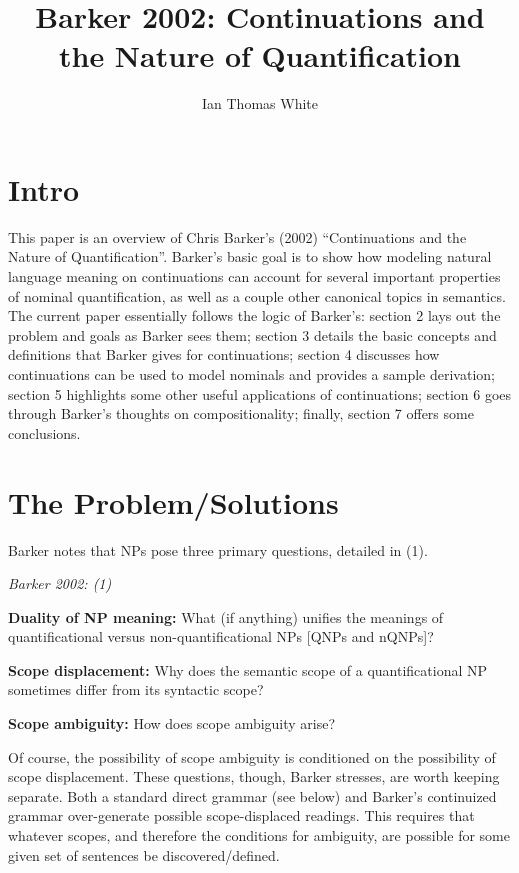\documentclass[11pt]{article}
\title{Barker 2002: Continuations and the Nature of Quantification}
\author{Ian Thomas White}
\date{}
\makeatletter
\renewcommand{\maketitle}
{
\begin{flushleft}
\textbf{{\large\@title}}
\newline
\@author
\end{flushleft}
}
\makeatother
\begin{document}
\thispagestyle{empty}
\maketitle
\tableofcontents
\newpage

\section{Intro}

This paper is an overview of Chris Barker's (2002) ``Continuations and the Nature of Quantification''. Barker's basic goal is to show how modeling natural language meaning on continuations can account for several important properties of nominal quantification, as well as a couple other canonical topics in semantics. The current paper essentially follows the logic of Barker's: section 2 lays out the problem and goals as Barker sees them; section 3 details the basic concepts and definitions that Barker gives for continuations; section 4 discusses how continuations can be used to model nominals and provides a sample derivation; section 5 highlights some other useful applications of continuations;  section 6 goes through Barker's thoughts on compositionality; finally, section 7 offers some conclusions.

\section{The Problem/Solutions}

Barker notes that NPs pose three primary questions, detailed in (1).
    
\pex \textit{Barker 2002: (1)}

\a \textbf{Duality of NP meaning:} What (if anything) unifies the meanings of quantificational versus non-quantificational NPs [QNPs and nQNPs]?

\a \textbf{Scope displacement:} Why does the semantic scope of a quantificational NP sometimes differ from its syntactic scope?

\a \textbf{Scope ambiguity:} How does scope ambiguity arise?

\xe

\noindent Of course, the possibility of scope ambiguity is conditioned on the possibility of scope displacement. These questions, though, Barker stresses, are worth keeping separate. Both a standard direct grammar (see below) and Barker's continuized grammar over-generate possible scope-displaced readings. This requires that whatever scopes, and therefore the conditions for ambiguity, are possible for some given set of sentences be discovered/defined.
    
\end{document}
